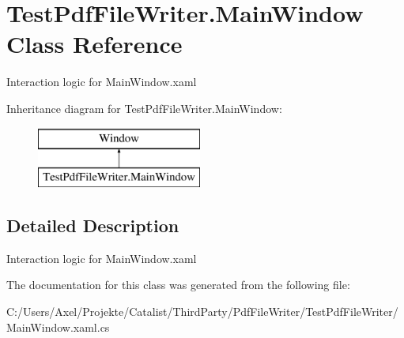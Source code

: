 \hypertarget{class_test_pdf_file_writer_1_1_main_window}{}\section{Test\+Pdf\+File\+Writer.\+Main\+Window Class Reference}
\label{class_test_pdf_file_writer_1_1_main_window}


Interaction logic for Main\+Window.\+xaml  


Inheritance diagram for Test\+Pdf\+File\+Writer.\+Main\+Window\+:\begin{figure}[H]
\begin{center}
\leavevmode
\includegraphics[height=2.000000cm]{class_test_pdf_file_writer_1_1_main_window}
\end{center}
\end{figure}


\subsection{Detailed Description}
Interaction logic for Main\+Window.\+xaml 



The documentation for this class was generated from the following file\+:\begin{DoxyCompactItemize}
\item 
C\+:/\+Users/\+Axel/\+Projekte/\+Catalist/\+Third\+Party/\+Pdf\+File\+Writer/\+Test\+Pdf\+File\+Writer/Main\+Window.\+xaml.\+cs\end{DoxyCompactItemize}
